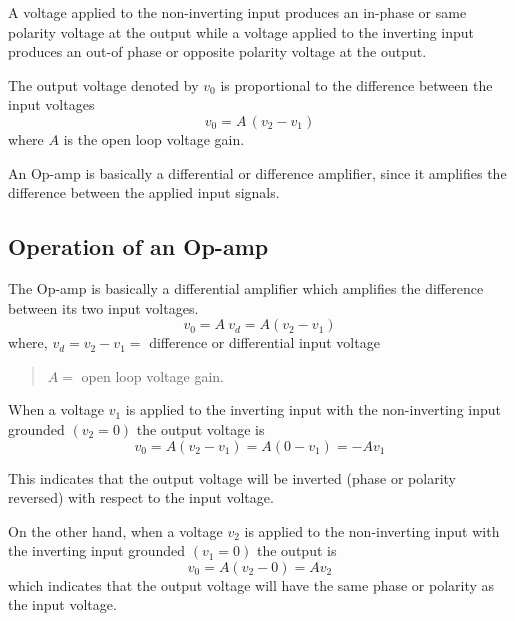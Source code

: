 A voltage applied to the non-inverting input produces an in-phase or same polarity voltage at the output while a voltage applied to the inverting input produces an out-of phase or opposite polarity voltage at the output.

The output voltage denoted by $v_{0}$ is proportional to the difference between the input voltages
\begin{equation}
v_{0}=A\,(v_{2}-v_{1})\label{eq5.1}
\end{equation}
where $A$ is the open loop voltage gain.

An Op-amp is basically a differential or difference amplifier, since it amplifies the difference between the applied input signals.

\subsection{Operation of an Op-amp}\label{sec5.1.2}

The Op-amp is basically a differential amplifier which amplifies the difference between its two input voltages.
\begin{equation}
v_{0}=A \ v_{d}=A(v_{2}-v_{1})\label{eq5.2}
\end{equation}
where, $v_{d}=v_{2}-v_{1}=$ difference or differential input voltage
\begin{quote}
$A=$ open loop voltage gain.
\end{quote}

When a voltage $v_{1}$ is applied to the inverting input with the non-inverting input grounded $(v_{2}=0)$ the output voltage is
\begin{equation}
v_{0}=A(v_{2}-v_{1})=A(0-v_{1})=-Av_{1}\label{eq5.3}
\end{equation}

This indicates that the output voltage will be inverted (phase or polarity reversed) with respect to the input voltage.

On the other hand, when a voltage $v_{2}$ is applied to the non-inverting input with the inverting input grounded $(v_{1}=0)$ the output is
\begin{equation}
v_{0}=A(v_{2}-0)=Av_{2}\label{eq5.4}
\end{equation}
which indicates that the output voltage will have the same phase or polarity as the input voltage.

